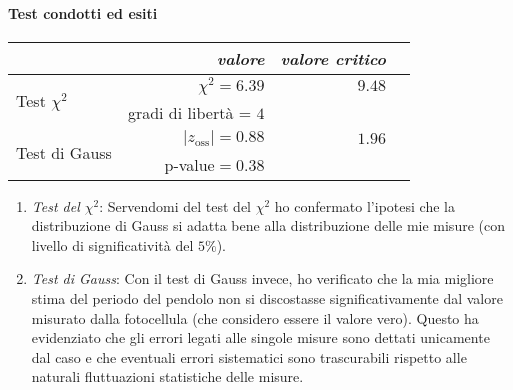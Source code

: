 \documentclass{article}
\begin{document}
	\paragraph{Test condotti ed esiti}
		\textcolor{white}{ }
	
		\begin{minipage}[c]{1\textwidth}
		\centering
		\renewcommand{\arraystretch}{1.5}
		\begin{tabular}{lrrl}
			& \textit{valore} & \textit{valore critico} & \\
			\hline
			\multirow{2}{8em}{Test $\chi^2$}& $\chi^2 = 6.39$ & $9.48$ & \\
			& gradi di libertà = $4$ & & \\
			\multirow{2}{8em}{Test di Gauss}& $|z_{\text{oss}}| = 0.88$  & $1.96$ & \\	
			&p-value$=0.38$ & & \\
		\end{tabular}
		\renewcommand{\arraystretch}{1}
	\end{minipage}
	\vspace{0.1cm}
	
	
	\begin{enumerate}
		\item \textit{Test del $\chi^2$}: Servendomi del test del $\chi^2$ ho confermato l'ipotesi che la distribuzione di Gauss si adatta bene alla distribuzione delle mie misure (con livello di significatività del $5\%$). 
		\item \textit{Test di Gauss}: Con il test di Gauss invece, ho verificato che la mia migliore stima del periodo del pendolo non si discostasse significativamente dal valore misurato dalla fotocellula (che considero essere il valore vero). Questo ha evidenziato che gli errori legati alle singole misure sono dettati unicamente dal caso e che eventuali errori sistematici sono trascurabili rispetto alle naturali fluttuazioni statistiche delle misure.
	\end{enumerate}
	
\end{document}

